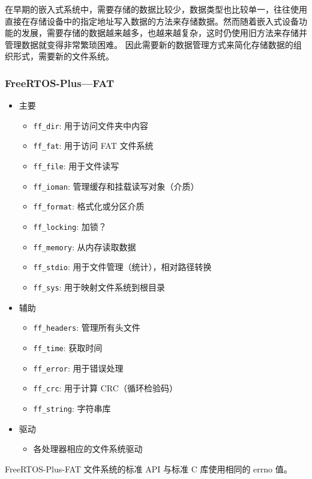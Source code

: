 \documentclass[a4paper]{article}
\begin{document}
在早期的嵌入式系统中，需要存储的数据比较少，数据类型也比较单一，往往使用直接在存储设备中的指定地址写入数据的方法来存储数据。然而随着嵌入式设备功能的发展，需要存储的数据越来越多，也越来越复杂，这时仍使用旧方法来存储并管理数据就变得非常繁琐困难。
因此需要新的数据管理方式来简化存储数据的组织形式，需要新的文件系统。

\subsubsection{FreeRTOS-Plus—FAT}
\begin{itemize}
\item 主要
\begin{itemize}
    \item \texttt{ff\_dir}: 用于访问文件夹中内容
    \item \texttt{ff\_fat}: 用于访问 FAT 文件系统
    \item \texttt{ff\_file}: 用于文件读写
    \item \texttt{ff\_ioman}: 管理缓存和挂载读写对象（介质）
    \item \texttt{ff\_format}: 格式化或分区介质
    \item \texttt{ff\_locking}: 加锁？
    \item \texttt{ff\_memory}: 从内存读取数据
    \item \texttt{ff\_stdio}: 用于文件管理（统计），相对路径转换
    \item \texttt{ff\_sys}: 用于映射文件系统到根目录
\end{itemize}
\item 辅助
\begin{itemize}
    \item \texttt{ff\_headers}: 管理所有头文件
    \item \texttt{ff\_time}: 获取时间
    \item \texttt{ff\_error}:  用于错误处理
    \item \texttt{ff\_crc}: 用于计算 CRC（循环检验码）
    \item \texttt{ff\_string}: 字符串库
\end{itemize}
\item 驱动
\begin{itemize}
    \item 各处理器相应的文件系统驱动
\end{itemize}
\end{itemize}

FreeRTOS-Plus-FAT 文件系统的标准 API 与标准 C 库使用相同的 errno 值。
\end{document}
